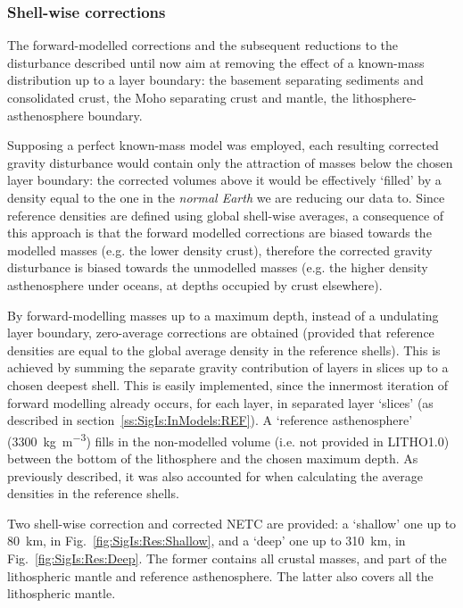 \subsubsection{Shell-wise corrections}
\label{sss:SigIs:Results:Maps:Shellwise}
The forward-modelled corrections and the subsequent reductions to the disturbance described until now aim at removing the effect of a known-mass distribution up to a layer boundary: the basement separating sediments and consolidated crust, the Moho separating crust and mantle, the lithosphere-asthenosphere boundary.

Supposing a perfect known-mass model was employed, each resulting corrected gravity disturbance would contain only the attraction of masses below the chosen layer boundary: the corrected volumes above it would be effectively `filled' by a density equal to the one in the \textit{normal Earth} we are reducing our data to.
Since reference densities are defined using global shell-wise averages, a consequence of this approach is that the forward modelled corrections are biased towards the modelled masses (e.g. the lower density crust), therefore the corrected gravity disturbance is biased towards the unmodelled masses (e.g. the higher density asthenosphere under oceans, at depths occupied by crust elsewhere).

By forward-modelling masses up to a maximum depth, instead of a undulating layer boundary, zero-average corrections are obtained (provided that reference densities are equal to the global average density in the reference shells).
This is achieved by summing the separate gravity contribution of layers in slices up to a chosen deepest shell.
This is easily implemented, since the innermost iteration of forward modelling already occurs, for each layer, in separated layer `slices' (as described in section~\ref{ss:SigIs:InModels:REF}).
A `reference asthenosphere' (\SI{3300}{\kilo \gram \per \cubic \metre}) fills in the non-modelled volume (i.e. not provided in {LITHO1.0}) between the bottom of the lithosphere and the chosen maximum depth.
As previously described, it was also accounted for when calculating the average densities in the reference shells.

Two shell-wise correction and corrected NETC are provided: a `shallow' one up to \SI{80}{\kilo \metre}, in Fig.~\ref{fig:SigIs:Res:Shallow}, and a `deep' one up to \SI{310}{\kilo \metre}, in Fig.~\ref{fig:SigIs:Res:Deep}.
The former contains all crustal masses, and part of the lithospheric mantle and reference asthenosphere. The latter also covers all the lithospheric mantle.

